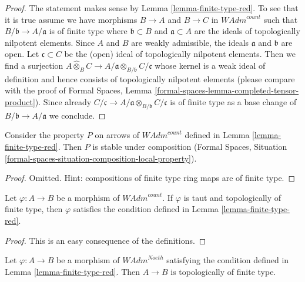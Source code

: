 \begin{proof}
The statement makes sense by Lemma \ref{lemma-finite-type-red}.
To see that it is true assume we have morphisms $B \to A$ and $B \to C$
in $\textit{WAdm}^{count}$ such that $B/\mathfrak b \to A/\mathfrak a$
is of finite type where $\mathfrak b \subset B$ and $\mathfrak a \subset A$
are the ideals of topologically nilpotent elements.
Since $A$ and $B$ are weakly admissible, the ideals
$\mathfrak a$ and $\mathfrak b$ are open.
Let $\mathfrak c \subset C$ be the (open) ideal
of topologically nilpotent elements. Then we find a surjection
$A \widehat{\otimes}_B C \to
A/\mathfrak a \otimes_{B/\mathfrak b} C/\mathfrak c$
whose kernel is a weak ideal of definition and hence consists
of topologically nilpotent elements
(please compare with the proof of Formal Spaces,
Lemma \ref{formal-spaces-lemma-completed-tensor-product}). Since already
$C/\mathfrak c \to A/\mathfrak a \otimes_{B/\mathfrak b} C/\mathfrak c$
is of finite type as a base change of $B/\mathfrak b \to A/\mathfrak a$
we conclude.
\end{proof}

\begin{lemma}
\label{lemma-composition-finite-type-red}
Consider the property $P$ on arrows of $\textit{WAdm}^{count}$ defined in
Lemma \ref{lemma-finite-type-red}. Then $P$ is stable under composition
(Formal Spaces, Situation
\ref{formal-spaces-situation-composition-local-property}).
\end{lemma}

\begin{proof}
Omitted. Hint: compositions of finite type ring maps are of finite type.
\end{proof}

\begin{lemma}
\label{lemma-finite-type-finite-type-red}
Let $\varphi : A \to B$ be a morphism of $\textit{WAdm}^{count}$.
If $\varphi$ is taut and topologically of finite type, then $\varphi$
satisfies the condition defined in Lemma \ref{lemma-finite-type-red}.
\end{lemma}

\begin{proof}
This is an easy consequence of the definitions.
\end{proof}

\begin{lemma}
\label{lemma-Noetherian-finite-type-red}
Let $\varphi : A \to B$ be a morphism of $\textit{WAdm}^{Noeth}$
satisfying the condition defined in Lemma \ref{lemma-finite-type-red}.
Then $A \to B$ is topologically of finite type.
\end{lemma}


